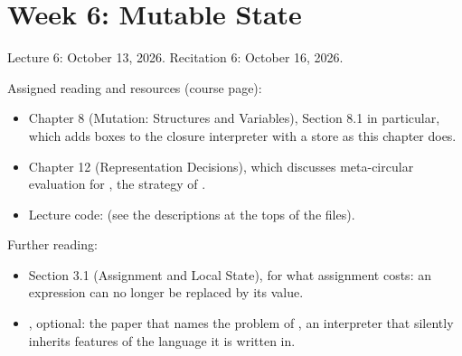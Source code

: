\chapter{Week 6: Mutable State}
\label{ch:week6}

Lecture 6: October 13, 2026. Recitation 6: October 16, 2026.

Assigned reading and resources (course page):
\begin{itemize}
  \item \cite{PLAI} Chapter 8 (Mutation: Structures and Variables), Section 8.1 in particular, which adds boxes to the closure interpreter with a store as this chapter does.
  \item \cite{PLAI} Chapter 12 (Representation Decisions), which discusses meta-circular evaluation for , the strategy of .
  \item Lecture code:  (see the descriptions at the tops of the files).
\end{itemize}

Further reading:
\begin{itemize}
  \item \cite{SICP} Section 3.1 (Assignment and Local State), for what assignment costs: an expression can no longer be replaced by its value.
  \item \cite{Reynolds}, optional: the paper that names the problem of , an interpreter that silently inherits features of the language it is written in.
\end{itemize}


